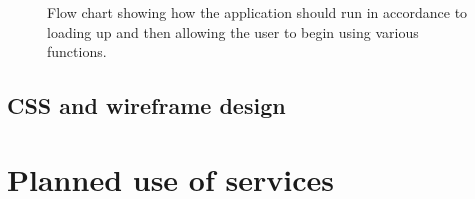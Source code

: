 \begin{figure}[h!]
  \centering
  \caption{Flow chart showing how the application should run in accordance to loading up and then allowing the user to begin using various functions.}
  \label{fig:usecase}
\end{figure}

\subsection{CSS and wireframe design}

\section{Planned use of services}

